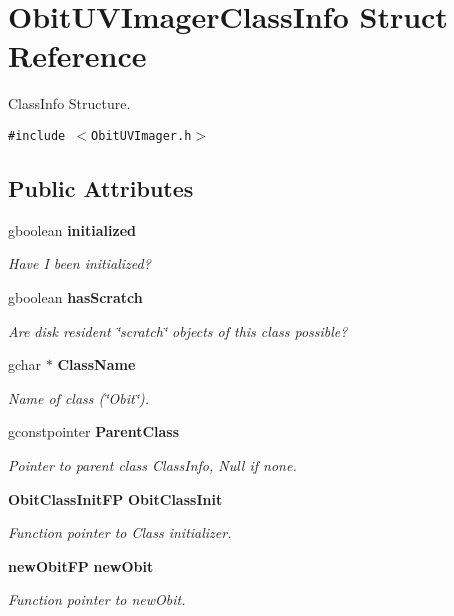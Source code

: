 \section{Obit\-UVImager\-Class\-Info Struct Reference}
\label{structObitUVImagerClassInfo}
Class\-Info Structure.  


{\tt \#include $<$Obit\-UVImager.h$>$}

\subsection*{Public Attributes}
\begin{CompactItemize}
\item 
gboolean {\bf initialized}
\begin{CompactList}\small\item\em Have I been initialized? \item\end{CompactList}\item 
gboolean {\bf has\-Scratch}
\begin{CompactList}\small\item\em Are disk resident \char`\"{}scratch\char`\"{} objects of this class possible? \item\end{CompactList}\item 
gchar $\ast$ {\bf Class\-Name}
\begin{CompactList}\small\item\em Name of class (\char`\"{}Obit\char`\"{}). \item\end{CompactList}\item 
gconstpointer {\bf Parent\-Class}
\begin{CompactList}\small\item\em Pointer to parent class Class\-Info, Null if none. \item\end{CompactList}\item 
{\bf Obit\-Class\-Init\-FP} {\bf Obit\-Class\-Init}
\begin{CompactList}\small\item\em Function pointer to Class initializer. \item\end{CompactList}\item 
{\bf new\-Obit\-FP} {\bf new\-Obit}
\begin{CompactList}\small\item\em Function pointer to new\-Obit. \item\end{CompactList}\item 

\end{CompactItemize}

